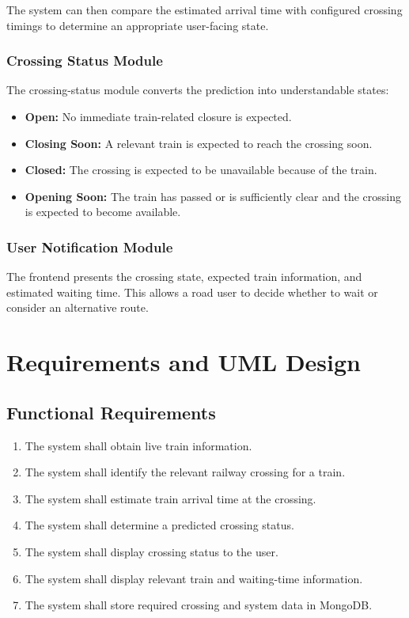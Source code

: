 \documentclass[12pt,a4paper]{report}
\begin{document}
The system can then compare the estimated arrival time with configured crossing
timings to determine an appropriate user-facing state.

\subsection{Crossing Status Module}

The crossing-status module converts the prediction into understandable states:

\begin{itemize}
  \item \textbf{Open:} No immediate train-related closure is expected.
  \item \textbf{Closing Soon:} A relevant train is expected to reach the crossing
        soon.
  \item \textbf{Closed:} The crossing is expected to be unavailable because of the
        train.
  \item \textbf{Opening Soon:} The train has passed or is sufficiently clear and
        the crossing is expected to become available.
\end{itemize}

\subsection{User Notification Module}

The frontend presents the crossing state, expected train information, and estimated
waiting time. This allows a road user to decide whether to wait or consider an
alternative route.


\chapter{Requirements and UML Design}

\section{Functional Requirements}

\begin{enumerate}
  \item The system shall obtain live train information.
  \item The system shall identify the relevant railway crossing for a train.
  \item The system shall estimate train arrival time at the crossing.
  \item The system shall determine a predicted crossing status.
  \item The system shall display crossing status to the user.
  \item The system shall display relevant train and waiting-time information.
  \item The system shall store required crossing and system data in MongoDB.
\end{enumerate}
\end{document}
